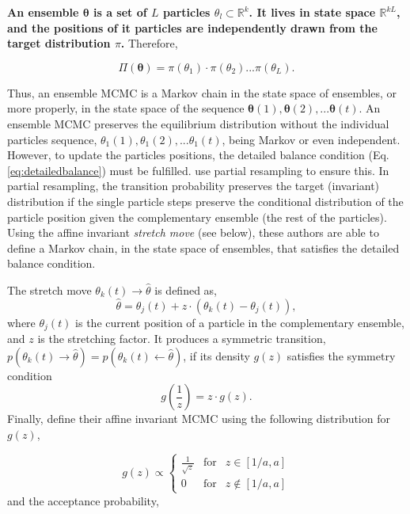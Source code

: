 \textbf{An ensemble $\boldsymbol{\theta}$ is a set of $L$ particles $\theta_l \subset \mathbb{R}^k$. It lives in state space $\mathbb{R}^{kL}$, and the positions of it particles are independently drawn from the target distribution $\pi$.} Therefore,

\begin{equation}
\Pi(\boldsymbol{\theta})=\pi(\theta_1)\cdot\pi(\theta_2)...\pi(\theta_L).\nonumber 
\end{equation}

Thus, an ensemble MCMC is a Markov chain in the state space of ensembles, or more properly, in the state space of the sequence $\boldsymbol{\theta}(1),\boldsymbol{\theta}(2),...\boldsymbol{\theta}(t)$. An ensemble MCMC preserves the equilibrium distribution without the individual particles sequence, $\theta_1(1),\theta_1(2),...\theta_1(t)$, being Markov or even independent. However, to update the particles positions, the detailed balance condition (Eq. \ref{eq:detailedbalance}) must be fulfilled. \citet{Goodman2010} use partial resampling to ensure this. In partial resampling, the transition probability preserves the target (invariant) distribution if the single particle steps preserve the conditional distribution of the particle position given the complementary ensemble (the rest of the particles). Using the affine invariant \emph{stretch move} (see below), these authors are able to define a Markov chain, in the state space of ensembles, that satisfies the detailed balance condition. 

The stretch move $\theta_k(t) \rightarrow \hat{\theta}$ is defined as,
\begin{equation}
\label{eq:stretchmove}
\hat{\theta}= \theta_j(t) + z\cdot(\theta_k(t)-\theta_j(t)),\nonumber 
\end{equation}
where $\theta_j(t)$ is the current position of a particle in the complementary ensemble, and $z$ is the stretching factor. It produces a symmetric transition, $p(\theta_k(t) \rightarrow \hat{\theta})=p(\theta_k(t) \leftarrow \hat{\theta})$, if its density $g(z)$ satisfies the symmetry condition
\begin{equation}
g(\frac{1}{z})= z\cdot g(z).\nonumber 
\end{equation}
Finally, \citet{Goodman2010} define their affine invariant MCMC using the following distribution for $g(z)$,

\begin{equation}
g(z) \propto \left\{ \begin{array}{rcl}
         \frac{1}{\sqrt{z}} & \mbox{for}&  z\in[1/a,a] \\ 
         0  & \mbox{for} &  z\notin[1/a,a]
                \end{array}\right.
\label{eq:gz}
\end{equation} 
and the acceptance probability,

